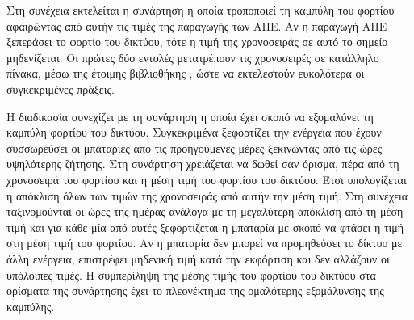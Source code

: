 \documentclass[12pt]{report}
\begin{document}
{}

Στη συνέχεια εκτελείται η συνάρτηση {\textbf{{}}} η οποία τροποποιεί τη καμπύλη του φορτίου αφαιρώντας από αυτήν τις τιμές της παραγωγής των ΑΠΕ. Αν η παραγωγή ΑΠΕ ξεπεράσει το φορτίο του δικτύου, τότε η τιμή της 
χρονοσειράς σε αυτό το σημείο μηδενίζεται. Οι πρώτες δύο εντολές μετατρέπουν τις χρονοσειρές σε κατάλληλο πίνακα, μέσω της έτοιμης βιβλιοθήκης {}, ώστε να εκτελεστούν ευκολότερα οι συγκεκριμένες πράξεις.

{}

Η διαδικασία συνεχίζει με τη συνάρτηση {\textbf{{}}} η οποία έχει σκοπό να εξομαλύνει τη καμπύλη φορτίου του δικτύου. Συγκεκριμένα ξεφορτίζει την ενέργεια που έχουν συσσωρεύσει οι μπαταρίες από τις
προηγούμενες μέρες ξεκινώντας από τις ώρες υψηλότερης ζήτησης. Στη συνάρτηση χρειάζεται να δωθεί σαν όρισμα, πέρα από τη χρονοσειρά του φορτίου και η μέση τιμή του φορτίου του δικτύου. Έτσι υπολογίζεται η
απόκλιση όλων των τιμών της χρονοσειράς από αυτήν την μέση τιμή. Στη συνέχεια ταξινομούνται οι ώρες της ημέρας ανάλογα με τη μεγαλύτερη απόκλιση από τη μέση τιμή και για κάθε μία από αυτές ξεφορτίζεται η μπαταρία με σκοπό να 
φτάσει η τιμή στη μέση τιμή του φορτίου. Αν η μπαταρία δεν μπορεί να προμηθεύσει το δίκτυο με άλλη ενέργεια, επιστρέφει μηδενική τιμή κατά την εκφόρτιση και δεν αλλάζουν οι υπόλοιπες τιμές. Η συμπερίληψη της μέσης τιμής του φορτίου
του δικτύου στα ορίσματα της συνάρτησης έχει το πλεονέκτημα της ομαλότερης εξομάλυνσης της καμπύλης.
\end{document}
